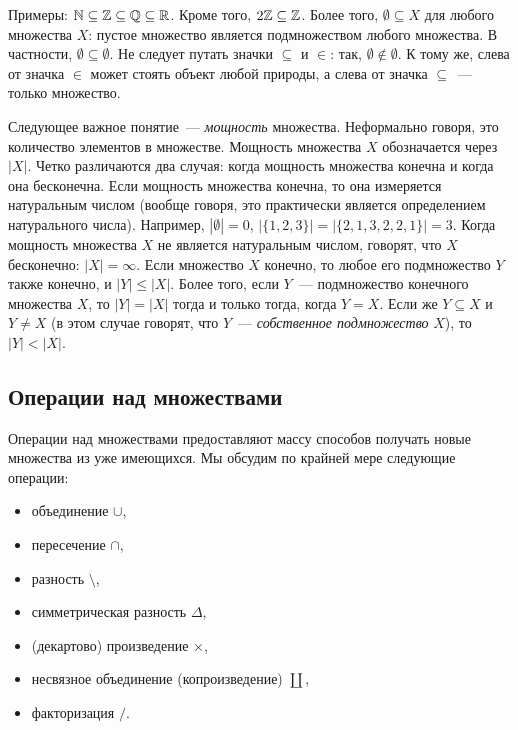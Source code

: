 Примеры: $\mathbb N\subseteq\mathbb Z\subseteq\mathbb Q\subseteq\mathbb R$. Кроме
того, $2\mathbb Z\subseteq\mathbb Z$. Более того, $\emptyset\subseteq X$ для
любого множества $X$: пустое множество является подмножеством любого
множества. В частности, $\emptyset\subseteq\emptyset$. Не следует
путать значки $\subseteq$ и $\in$: так, $\emptyset\not\in\emptyset$. К
тому же, слева от значка $\in$ может стоять объект любой природы, а
слева от значка $\subseteq$~--- только множество.

Следующее важное понятие~--- {\it мощность} множества. Неформально
говоря, это количество элементов в множестве. Мощность множества $X$
обозначается через $|X|$. Четко различаются два
случая: когда мощность множества конечна и когда она
бесконечна. Если мощность множества конечна, то она измеряется
натуральным числом (вообще говоря, это практически является
определением натурального числа). Например, $|\emptyset|=0$,
$|\{1,2,3\}|=|\{2,1,3,2,2,1\}|=3$. Когда мощность множества $X$ не является
натуральным числом, говорят, что $X$ бесконечно: $|X|=\infty$.
Если множество $X$ конечно, то любое его подмножество $Y$ также
конечно, и $|Y|\leq |X|$. Более того, если $Y$~--- подмножество
конечного множества $X$,
то $|Y|=|X|$ тогда и только тогда,
когда $Y=X$. Если же $Y\subseteq X$ и $Y\neq X$ (в этом случае
говорят, что $Y$~--- {\it собственное подмножество} $X$), то $|Y|<|X|$.

\subsection{Операции над множествами}


Операции над множествами предоставляют массу способов получать новые
множества из уже имеющихся. Мы обсудим по крайней мере следующие
операции:

\begin{itemize}
\item объединение $\cup$,
\item пересечение $\cap$,
\item разность $\setminus$,
\item симметрическая разность $\Delta$,
\item (декартово)  произведение $\times$,
\item несвязное объединение (копроизведение) $\coprod$,
\item факторизация $/$.
\end{itemize}

